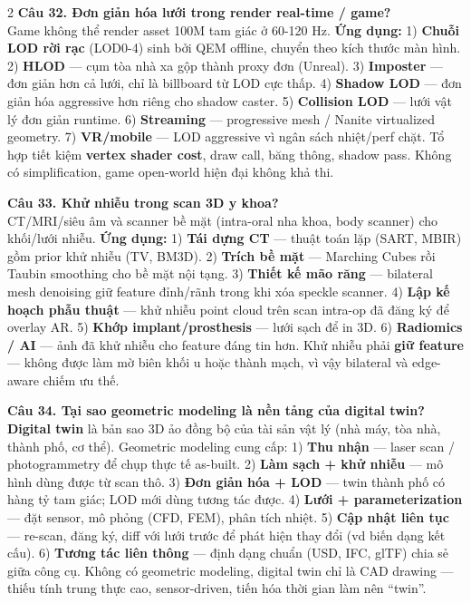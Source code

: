 \begin{paracol}{2}
\textbf{Câu 32. Đơn giản hóa lưới trong render real-time / game?}\\
Game không thể render asset 100M tam giác ở 60-120 Hz. \textbf{Ứng dụng:} 1) \textbf{Chuỗi LOD rời rạc} (LOD0-4) sinh bởi QEM offline, chuyển theo kích thước màn hình. 2) \textbf{HLOD} — cụm tòa nhà xa gộp thành proxy đơn (Unreal). 3) \textbf{Imposter} — đơn giản hơn cả lưới, chỉ là billboard từ LOD cực thấp. 4) \textbf{Shadow LOD} — đơn giản hóa aggressive hơn riêng cho shadow caster. 5) \textbf{Collision LOD} — lưới vật lý đơn giản runtime. 6) \textbf{Streaming} — progressive mesh / Nanite virtualized geometry. 7) \textbf{VR/mobile} — LOD aggressive vì ngân sách nhiệt/perf chặt. Tổ hợp tiết kiệm \textbf{vertex shader cost}, draw call, băng thông, shadow pass. Không có simplification, game open-world hiện đại không khả thi.

\textbf{Câu 33. Khử nhiễu trong scan 3D y khoa?}\\
CT/MRI/siêu âm và scanner bề mặt (intra-oral nha khoa, body scanner) cho khối/lưới nhiễu. \textbf{Ứng dụng:} 1) \textbf{Tái dựng CT} — thuật toán lặp (SART, MBIR) gồm prior khử nhiễu (TV, BM3D). 2) \textbf{Trích bề mặt} — Marching Cubes rồi Taubin smoothing cho bề mặt nội tạng. 3) \textbf{Thiết kế mão răng} — bilateral mesh denoising giữ feature đỉnh/rãnh trong khi xóa speckle scanner. 4) \textbf{Lập kế hoạch phẫu thuật} — khử nhiễu point cloud trên scan intra-op đã đăng ký để overlay AR. 5) \textbf{Khớp implant/prosthesis} — lưới sạch để in 3D. 6) \textbf{Radiomics / AI} — ảnh đã khử nhiễu cho feature đáng tin hơn. Khử nhiễu phải \textbf{giữ feature} — không được làm mờ biên khối u hoặc thành mạch, vì vậy bilateral và edge-aware chiếm ưu thế.

\textbf{Câu 34. Tại sao geometric modeling là nền tảng của digital twin?}\\
\textbf{Digital twin} là bản sao 3D ảo đồng bộ của tài sản vật lý (nhà máy, tòa nhà, thành phố, cơ thể). Geometric modeling cung cấp: 1) \textbf{Thu nhận} — laser scan / photogrammetry để chụp thực tế as-built. 2) \textbf{Làm sạch + khử nhiễu} — mô hình dùng được từ scan thô. 3) \textbf{Đơn giản hóa + LOD} — twin thành phố có hàng tỷ tam giác; LOD mới dùng tương tác được. 4) \textbf{Lưới + parameterization} — đặt sensor, mô phỏng (CFD, FEM), phân tích nhiệt. 5) \textbf{Cập nhật liên tục} — re-scan, đăng ký, diff với lưới trước để phát hiện thay đổi (vd biến dạng kết cấu). 6) \textbf{Tương tác liên thông} — định dạng chuẩn (USD, IFC, glTF) chia sẻ giữa công cụ. Không có geometric modeling, digital twin chỉ là CAD drawing — thiếu tính trung thực cao, sensor-driven, tiến hóa thời gian làm nên ``twin''.


\end{paracol}
